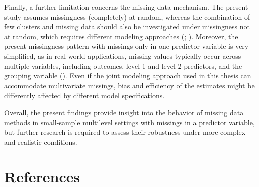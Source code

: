 \documentclass[
  letterpaper,
  11pt,
  english,
  singlespacing,
  headsepline,
  openany]{MastersDoctoralThesis}
\begin{document}
Finally, a further limitation concerns the missing data mechanism. The
present study assumes missingness (completely) at random, whereas the
combination of few clusters and missing data should also be investigated
under missingness not at random, which requires different modeling
approaches (;
). Moreover, the present
missingness pattern with missings only in one predictor variable is very
simplified, as in real-world applications, missing values typically
occur across multiple variables, including outcomes, level-1 and level-2
predictors, and the grouping variable (). Even if the joint modeling approach used in this thesis can
accommodate multivariate missings, bias and efficiency of the estimates
might be differently affected by different model specifications.

Overall, the present findings provide insight into the behavior of
missing data methods in small-sample multilevel settings with missings
in a predictor variable, but further research is required to assess
their robustness under more complex and realistic conditions.


\chapter*{References}\label{references}

\end{document}
